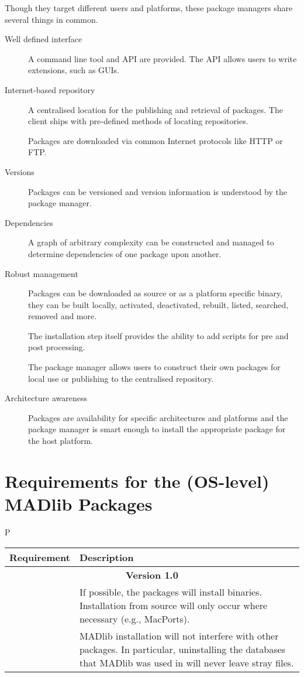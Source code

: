 \documentclass[11pt]{article}
\begin{document}
{Though they target different users and platforms, these package managers share
several things in common.

\begin{description}
	\item[Well defined interface] A command line tool and API are provided.
	The API allows users to write extensions, such as GUIs.

	\item[Internet-based repository] A centralised location for the publishing
	and retrieval of packages. The client ships with pre-defined methods of
	locating repositories.

	Packages are downloaded via common Internet protocols like HTTP or FTP.

	\item[Versions] Packages can be versioned and version information is
	understood by the package manager.

	\item[Dependencies] A graph of arbitrary complexity can be constructed and
	managed to determine dependencies of one package upon another.

	\item[Robust management] Packages can be downloaded as source or as a
	platform specific binary, they can be built locally, activated, deactivated,
	rebuilt, listed, searched, removed and more.
	
	The installation step itself provides the ability to add scripts for pre and
	post processing.

	The package manager allows users to construct their own packages for local
	use or publishing to the centralised repository.

	\item[Architecture awareness] Packages are availability for specific
	architectures and platforms and the package manager is smart enough to
	install the appropriate package for the host platform.

\end{description}

\ifx\pdfoutput\undefined %
\else
{}
\fi

\section{Requirements for the (OS-level) MADlib Packages}

\begin{mlreq}{P}
\begin{tabular}{|l|p{133mm}|}
\hline
	\textbf{Requirement} & \textbf{Description} \\
\hline
	\multicolumn{2}{|c|}{\bf Version 1.0} \\
\hline
	\mlr & If possible, the packages will install binaries. Installation from source will only occur where necessary (e.g., MacPorts). \\
\hline
	\mlr & MADlib installation will not interfere with other packages. In particular, uninstalling the databases that MADlib was used in will never leave stray files. \\
\hline


\end{tabular}
\end{mlreq}}
\end{document}
